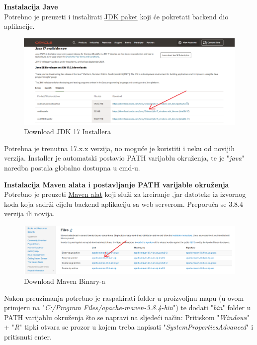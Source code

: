 			\textbf{Instalacija Jave}\\
			Potrebno je preuzeti i instalirati \href{https://www.oracle.com/java/technologies/downloads/#jdk17-windows}{JDK paket} koji će pokretati backend dio aplikacije.
			
			\begin{figure}[H]
			\centering
			\includegraphics[width=\textwidth, scale=0.5]{slike/JDKdownload}
			\caption{Download JDK 17 Installera}
			\label{fig:JDKdownload}
			\end{figure}

			Potrebna je trenutna 17.x.x verzija, no moguće je koristiti i neku od novijih verzija. Installer je automatski postavio PATH varijablu okruženja, te je "\textit{java}" naredba postala globalno dostupna u cmd-u.
			
			\textbf{Instalacija Maven alata i postavljanje PATH varijable okruženja}\\
			Potrebno je preuzeti \href{https://maven.apache.org/download.cgi}{Maven alat} koji služi za kreiranje .jar datoteke iz izvornog koda koja sadrži cijelu backend aplikaciju sa web serverom. Preporuča se 3.8.4 verzija ili novija.
			
			\begin{figure}[H]
			\centering
			\includegraphics[width=\textwidth, scale=0.5]{slike/mavenDownload}
			\caption{Download Maven Binary-a}
			\label{fig:mavenDownload}
			\end{figure}
			
			Nakon preuzimanja potrebno je raspakirati folder u proizvoljnu mapu (u ovom primjeru na "\textit{C:/Program Files/apache-maven-3.8.4-bin}") te dodati "\textit{bin}" folder u PATH varijablu okruženja što se napravi na sljedeći način: 
			Pritiskom "\textit{Windows}" + "\textit{R}" tipki otvara se prozor u kojem treba napisati "\textit{SystemPropertiesAdvanced}" i pritisnuti enter.
			
